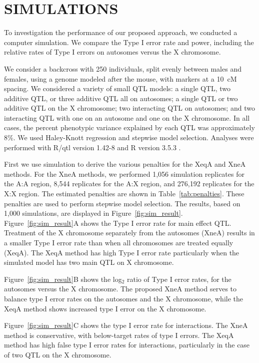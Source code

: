 \documentclass[12pt,letterpaper]{article}
\begin{document}
\clearpage
\section*{SIMULATIONS}

To investigation the performance of our proposed approach, we
conducted a computer simulation. We compare the Type I error rate and
power, including the relative rates of Type I errors on autosomes
versus the X chromosome.

We consider a backcross with 250 individuals, split evenly between males and females, using a genome modeled
after the mouse, with markers at a 10~cM spacing. We considered a
variety of small QTL models: a single QTL, two additive QTL, or three
additive QTL all on autosomes; a single QTL or two additive QTL on the
X chromosome; two interacting QTL on autosomes; and two interacting
QTL with one on an autosome and one on the X chromosome. In all cases,
the percent phenotypic variance explained by each QTL was
approximately 8\%. We used Haley-Knott regression \citep{Haley1992}
and stepwise model selection. Analyses were performed with R/qtl
version 1.42-8 \citep{Broman2002} and R version 3.5.3 \citep{R}.

First we use simulation to derive the various penalties for the XeqA
and XneA methods. For the XneA methods, we performed 1,056 simulation replicates for the A:A region, 8,544 replicates for the A:X region, and 276,192 replicates for the X:X region. The estimated penalties are shown in Table~\ref{tab:penalties}.
These penalties are used to perform stepwise model selection.
The results, based on 1,000 simulations, are displayed in
Figure~\ref{fig:sim_result}.
Figure~\ref{fig:sim_result}A shows the Type I error rate for main
effect QTL. Treatment of the X chromosome separately from the
autosomes (XneA) results in a smaller Type I error rate than when all
chromosomes are treated equally (XeqA).
The XeqA method has high Type I error rate particularly when  the
simulated model has two main QTL on X chromosome.

Figure~\ref{fig:sim_result}B shows the log$_2$ ratio of Type I error
rates, for the autosomes versus the X chromosome. The proposed XneA
method serves to balance type I error rates on the autosomes and the X
chromosome, while the XeqA method shows increased type I error on the X
chromosome.

Figure~\ref{fig:sim_result}C shows the type I error rate for
interactions. The XneA method is conservative, with below-target rates of
type I errors. The XeqA method has high false type I error rates for interactions,
particularly in the case of two QTL on the X chromosome.
\end{document}
